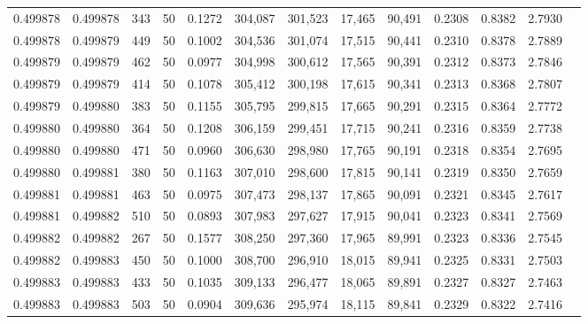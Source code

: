 \begin{tabular}{rrrrrrrrrrrrr}
0.499878 & 0.499878 &   343 &  50 &                                     0.1272 & 304,087 & 301,523 &  17,465 &  90,491 & 0.2308 & 0.8382 & 2.7930 \\
0.499878 & 0.499879 &   449 &  50 &                                     0.1002 & 304,536 & 301,074 &  17,515 &  90,441 & 0.2310 & 0.8378 & 2.7889 \\
0.499879 & 0.499879 &   462 &  50 &                                     0.0977 & 304,998 & 300,612 &  17,565 &  90,391 & 0.2312 & 0.8373 & 2.7846 \\
0.499879 & 0.499879 &   414 &  50 &                                     0.1078 & 305,412 & 300,198 &  17,615 &  90,341 & 0.2313 & 0.8368 & 2.7807 \\
0.499879 & 0.499880 &   383 &  50 &                                     0.1155 & 305,795 & 299,815 &  17,665 &  90,291 & 0.2315 & 0.8364 & 2.7772 \\
0.499880 & 0.499880 &   364 &  50 &                                     0.1208 & 306,159 & 299,451 &  17,715 &  90,241 & 0.2316 & 0.8359 & 2.7738 \\
0.499880 & 0.499880 &   471 &  50 &                                     0.0960 & 306,630 & 298,980 &  17,765 &  90,191 & 0.2318 & 0.8354 & 2.7695 \\
0.499880 & 0.499881 &   380 &  50 &                                     0.1163 & 307,010 & 298,600 &  17,815 &  90,141 & 0.2319 & 0.8350 & 2.7659 \\
0.499881 & 0.499881 &   463 &  50 &                                     0.0975 & 307,473 & 298,137 &  17,865 &  90,091 & 0.2321 & 0.8345 & 2.7617 \\
0.499881 & 0.499882 &   510 &  50 &                                     0.0893 & 307,983 & 297,627 &  17,915 &  90,041 & 0.2323 & 0.8341 & 2.7569 \\
0.499882 & 0.499882 &   267 &  50 &                                     0.1577 & 308,250 & 297,360 &  17,965 &  89,991 & 0.2323 & 0.8336 & 2.7545 \\
0.499882 & 0.499883 &   450 &  50 &                                     0.1000 & 308,700 & 296,910 &  18,015 &  89,941 & 0.2325 & 0.8331 & 2.7503 \\
0.499883 & 0.499883 &   433 &  50 &                                     0.1035 & 309,133 & 296,477 &  18,065 &  89,891 & 0.2327 & 0.8327 & 2.7463 \\
0.499883 & 0.499883 &   503 &  50 &                                     0.0904 & 309,636 & 295,974 &  18,115 &  89,841 & 0.2329 & 0.8322 & 2.7416 \\

\end{tabular}
